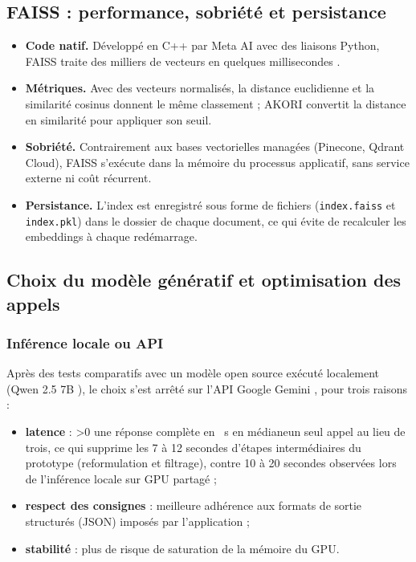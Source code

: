 \documentclass[12pt,a4paper,oneside]{report}
\newcommand{\siGemini}[2]{\ifnum\GemN>0 #1\else #2\fi}
\begin{document}
\subsection{FAISS : performance, sobriété et persistance}

\begin{itemize}
  \item \textbf{Code natif.} Développé en C++ par Meta AI avec des liaisons Python, FAISS traite des milliers de vecteurs en quelques millisecondes \cite{douze2024faiss}.
  \item \textbf{Métriques.} Avec des vecteurs normalisés, la distance euclidienne et la similarité cosinus donnent le même classement ; AKORI convertit la distance en similarité pour appliquer son seuil.
  \item \textbf{Sobriété.} Contrairement aux bases vectorielles managées (Pinecone, Qdrant Cloud), FAISS s'exécute dans la mémoire du processus applicatif, sans service externe ni coût récurrent.
  \item \textbf{Persistance.} L'index est enregistré sous forme de fichiers (\texttt{index.faiss} et \texttt{index.pkl}) dans le dossier de chaque document, ce qui évite de recalculer les embeddings à chaque redémarrage.
\end{itemize}

\subsection{Choix du modèle génératif et optimisation des appels}

\subsubsection*{Inférence locale ou API}

Après des tests comparatifs avec un modèle open source exécuté localement (Qwen 2.5 7B \cite{qwen2024report}), le choix s'est arrêté sur l'API Google Gemini \cite{gemini2023}, pour trois raisons :
\begin{itemize}[nosep]
  \item \textbf{latence} : \siGemini{une réponse complète en \GemTotal~s en médiane}{un seul appel au lieu de trois, ce qui supprime les 7 à 12 secondes d'étapes intermédiaires du prototype (reformulation et filtrage)}, contre 10 à 20 secondes observées lors de l'inférence locale sur GPU partagé ;
  \item \textbf{respect des consignes} : meilleure adhérence aux formats de sortie structurés (JSON) imposés par l'application ;
  \item \textbf{stabilité} : plus de risque de saturation de la mémoire du GPU.
\end{itemize}
\end{document}
